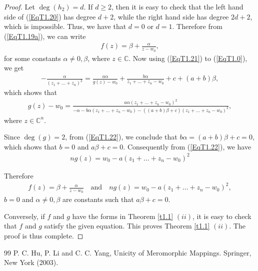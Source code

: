 \documentclass[10pt,a4paper]{amsart}
\begin{document}
\begin{proof}
Let $\deg(h_2)=d$. If $d\geq 2$, then it is easy to check that
the left hand side of (\ref{EqT1.20}) has degree $d+2$, while the right hand side has degree $2d + 2$, which is impossible. Thus, we have that $d = 0$ or $d = 1$. Therefore from (\ref{EqT1.19a}), we can write 
\begin{align}\label{EqT1.21}
f(z)=\beta+\frac{\alpha}{z-w_0},
\end{align}
for some constants $\alpha\neq 0, \beta$, where $z\in\mathbb{C}$. Now using (\ref{EqT1.21}) to (\ref{EqT1.0}), we get 
\begin{align*}
-\frac{\alpha}{(z_1+\ldots+z_n)^2}=\frac{a\alpha}{g(z)-w_0}+\frac{b\alpha}{z_1+\ldots+z_n-w_0}+c+(a+b)\beta,
\end{align*}
which shows that
\begin{align}\label{EqT1.22}
g(z)-w_0=\frac{a\alpha(z_1+\ldots+z_n-w_0)^2}{-\alpha-b\alpha(z_1+\ldots+z_n-w_0)-((a+b)\beta+c)(z_1+\ldots+z_n-w_0)^2},
\end{align}
where $z\in\mathbb{C}^n$.

Since $\deg(g)=2$, from (\ref{EqT1.22}), we conclude that $b\alpha=(a+b)\beta+c=0$, which shows that $b=0$ and $a\beta+c=0$. 
Consequently from (\ref{EqT1.22}), we have
\begin{align*}
ng(z)=w_0-a\left(z_1+\ldots+z_n-w_0\right)^2
\end{align*}

Therefore
\begin{align*}
f(z)=\beta+\frac{\alpha}{z-w_0}\quad \text{and}\quad ng(z)=w_0-a\left(z_1+\ldots+z_n-w_0\right)^2,
\end{align*}
$b=0$ and $\alpha\neq 0, \beta$ are constants such that $a\beta+c=0$.

Conversely, if $f$ and $g$ have the forms in Theorem \ref{t1.1} $(ii)$, it is easy to check that $f$ and $g$ satisfy the given equation. This proves Theorem \ref{t1.1} $(ii)$. The proof is thus complete.
\end{proof}

\begin{thebibliography}{99}
 {\sc P. C. Hu}, {\sc P. Li} and {\sc C. C. Yang}, Unicity of Meromorphic Mappings. Springer, New York (2003).
\end{thebibliography}
\end{document}
